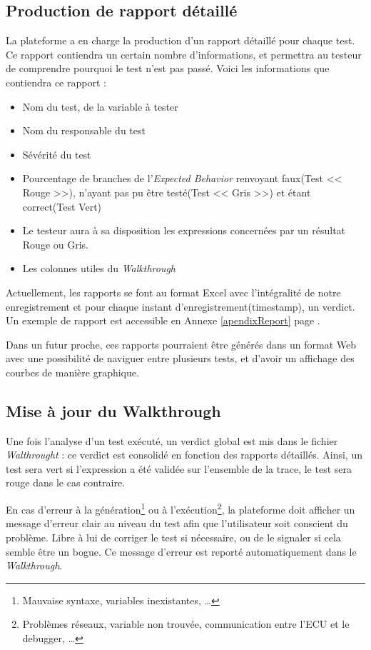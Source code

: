 \subsection{Production de rapport détaillé}\label{report}
La plateforme a en charge la production d'un rapport détaillé pour chaque test. Ce rapport contiendra un certain nombre d'informations, et permettra au testeur de comprendre pourquoi le test n'est pas passé. Voici les informations que contiendra ce rapport : 

\begin{itemize}
	\item Nom du test, de la variable à tester
	\item Nom du responsable du test
	\item Sévérité du test
	\item Pourcentage de branches de l'\textit{Expected Behavior} renvoyant faux(Test << Rouge >>), n'ayant pas pu être testé(Test << Gris >>) et étant correct(Test Vert)
	\item Le testeur aura à sa disposition les expressions concernées par un résultat Rouge ou Gris.
	\item Les colonnes utiles du \textit{Walkthrough}
\end{itemize}

Actuellement, les rapports se font au format Excel avec l'intégralité de notre enregistrement et pour chaque instant d'enregistrement(timestamp), un verdict. Un
exemple de rapport est accessible en Annexe \ref{apendixReport} page \pageref{apendixReport}. 

Dans un futur proche, ces rapports pourraient être générés dans un format Web avec une possibilité de naviguer entre plusieurs tests, et
d'avoir un affichage des courbes de manière graphique.

\subsection{Mise à jour du Walkthrough}
Une fois l'analyse d'un test exécuté, un verdict global est mis dans le fichier \textit{Walthrought} : ce verdict est consolidé en fonction des rapports détaillés. Ainsi, un test sera vert si l'expression a été validée sur l'ensemble de la trace, le test sera rouge dans le cas contraire.

\begin{remarque}
	En cas d'erreur à la génération\footnote{Mauvaise syntaxe, variables inexistantes, \ldots} ou à l'exécution\footnote{Problèmes réseaux, variable non trouvée, communication entre l'ECU et le debugger, \ldots}, la plateforme doit afficher un message d'erreur clair au niveau du test afin que l'utilisateur soit conscient du problème. Libre à lui de corriger le test si nécessaire, ou de le signaler si cela semble être un bogue. Ce message d'erreur est reporté automatiquement dans le \textit{Walkthrough}.
\end{remarque}

